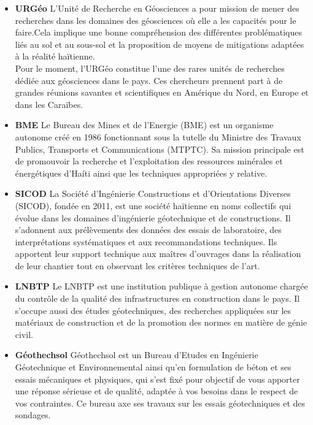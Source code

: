             \begin{itemize}
                \item \textbf{URGéo}
                L'Unité de Recherche en Géosciences a pour mission de mener des
                recherches dans les domaines des géosciences où elle a les capacités
                pour le faire.Cela implique une bonne compréhension des différentes 
                problématiques liés au sol et au sous-sol et la proposition de moyens
                de mitigations adaptées à la réalité haïtienne.
                \cite{mission_urgeo}
                \\
                Pour le moment, l’URGéo constitue l’une des rares unités de recherches
                dédiée aux géosciences dans le pays. Ces chercheurs prennent part à de
                grandes réunions savantes et scientifiques en Amérique du Nord, en 
                Europe et dans les Caraïbes.
                \item \textbf{BME}
                Le Bureau des Mines et de l’Energie (BME) est un organisme autonome créé en 
                1986 fonctionnant sous la tutelle du Ministre des Travaux Publics, Transports 
                et Communications (MTPTC). Sa mission principale est de promouvoir la recherche
                et l'exploitation des ressources minérales et énergétiques d'Haíti ainsi que les 
                techniques appropriées y relative.
                \item \textbf{SICOD}
                La  Société d’Ingénierie Constructions et d’Orientations Diverses (SICOD),
                fondée en 2011, est une société haïtienne en noms collectifs qui évolue dans 
                les domaines d’ingénierie géotechnique et de constructions.
                Il s'adonnent aux prélèvements des données des essais de laboratoire, des 
                interprétations systématiques et aux recommandations techniques. 
                Ils apportent leur support technique aux maîtres d'ouvrages dans la réalisation 
                de leur chantier tout en observant les critères techniques de l'art.
                \item \textbf{LNBTP}
                Le LNBTP est une institution publique à gestion autonome chargée du contrôle de
                la qualité des infrastructures en construction dans le pays. Il s'occupe 
                aussi des études géotechniques, des recherches appliquées sur les matériaux de 
                construction et de la promotion des normes en matière de génie civil.
                \item \textbf{Géothechsol}
                Géothechsol est un Bureau d’Etudes en Ingénierie Géotechnique et Environnemental
                ainsi qu’en formulation de béton et ses essais mécaniques et physiques, qui s’est
                fixé pour objectif de vous apporter une réponse sérieuse et de qualité, adaptée à 
                vos besoins dans le respect de vos contraintes. Ce bureau axe ses travaux sur les
                 essais géotechniques et des sondages.
            \end{itemize}      

